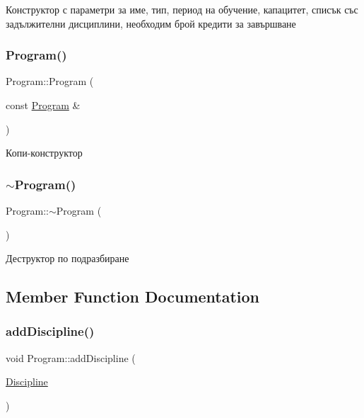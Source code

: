 Конструктор с параметри за име, тип, период на обучение, капацитет, списък със задължителни дисциплини, необходим брой кредити за завършване 

\mbox{\label{class_program_aa81dab37b223bfc53c08f56d437ada28}} 
\subsubsection{\texorpdfstring{Program()}{Program()}\hspace{0.1cm}{\footnotesize\ttfamily [4/4]}}
{\footnotesize\ttfamily Program\+::\+Program (\begin{DoxyParamCaption}\item[{const \hyperlink{class_program}{Program} \&}]{ }\end{DoxyParamCaption})}



Копи-\/конструктор 

\mbox{\label{class_program_a1836e019558056cd131f87fb7a2a1547}} 
\subsubsection{\texorpdfstring{$\sim$\+Program()}{~Program()}}
{\footnotesize\ttfamily Program\+::$\sim$\+Program (\begin{DoxyParamCaption}{ }\end{DoxyParamCaption})\hspace{0.3cm}{\ttfamily [default]}}



Деструктор по подразбиране 



\subsection{Member Function Documentation}
\mbox{\label{class_program_a383a0511ac35359940d9916f176da268}} 
\subsubsection{\texorpdfstring{add\+Discipline()}{addDiscipline()}}
{\footnotesize\ttfamily void Program\+::add\+Discipline (\begin{DoxyParamCaption}\item[{\hyperlink{class_discipline}{Discipline}}]{ }\end{DoxyParamCaption})}



